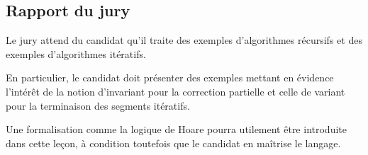 \documentclass[../../Agregation.tex]{subfiles}
\begin{document}

\subsection{Rapport du jury}

\begin{aquote}{}
Le jury attend du candidat qu'il traite des exemples d'algorithmes récursifs et des exemples d'algorithmes itératifs.

En particulier, le candidat doit présenter des exemples mettant en évidence l'intérêt de la notion d'invariant pour la correction partielle et celle de variant pour la terminaison des segments itératifs.

Une formalisation comme la logique de Hoare pourra utilement être introduite dans cette leçon, à condition toutefois que le candidat en maîtrise le langage.
\end{aquote}

\dvts
\end{document}
